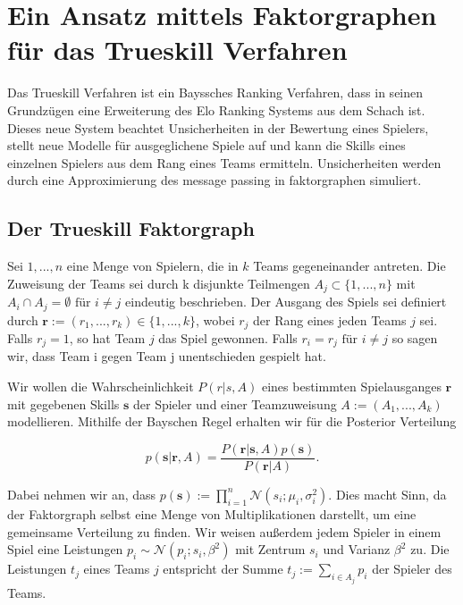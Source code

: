 \documentclass[12pt,a4paper]{scrartcl}
\numberwithin{equation}{section}
\begin{document}
 \newpage  %

\section{Ein Ansatz mittels Faktorgraphen für das Trueskill Verfahren}
Das Trueskill Verfahren ist ein Bayssches Ranking Verfahren, dass in seinen Grundzügen eine Erweiterung des
Elo Ranking Systems aus dem Schach ist. 
Dieses neue System beachtet Unsicherheiten in der Bewertung eines Spielers, stellt neue Modelle für ausgeglichene
Spiele auf und kann die Skills eines einzelnen Spielers aus dem Rang eines Teams ermitteln. 
Unsicherheiten werden durch eine Approximierung des message passing in faktorgraphen simuliert.  

\subsection{Der Trueskill Faktorgraph}

 Sei ${1,...,n}$ eine Menge von Spielern, die in $k$ Teams gegeneinander antreten. Die Zuweisung der Teams sei durch k disjunkte Teilmengen
 $A_j \subset \{1,...,n\}$ mit $A_i \cap A_j = \emptyset \text{ für } i \neq j$ eindeutig beschrieben. Der Ausgang des Spiels sei definiert durch $\mathbf{r} := (r_1,...,r_k) \in \{1,...,k\}$,
 wobei $r_j$ der Rang eines jeden Teams $j$ sei. Falls $r_j = 1$, so hat Team $j$ das Spiel gewonnen. Falls $r_i = r_j \text{ für } i \neq j$ so sagen wir, dass Team i gegen Team j
 unentschieden gespielt hat. 
 
 Wir wollen die Wahrscheinlichkeit $P(r|s,A)$ eines bestimmten Spielausganges $\mathbf{r}$ mit gegebenen Skills $\mathbf{s}$ der Spieler und einer Teamzuweisung $A := (A_1,...,A_k)$ modellieren. 
 Mithilfe der Bayschen Regel erhalten wir für die Posterior Verteilung
 
 \begin{equation}
  p(\mathbf{s}|\mathbf{r},A) = \frac{P(\mathbf{r}|\mathbf{s},A)p(\mathbf{s})}{P(\mathbf{r}|A)}.
 \end{equation}

 Dabei nehmen wir an, dass $p(\mathbf{s}) := \prod_{i = 1}^n \mathcal{N}(s_i;\mu_i,\sigma_i^2)$. Dies macht Sinn, da der Faktorgraph selbst eine Menge von Multiplikationen darstellt, um
 eine gemeinsame Verteilung zu finden. 
 Wir weisen außerdem jedem Spieler in einem Spiel eine Leistungen $p_i \sim \mathcal{N}(p_i; s_i,\beta^2)$ mit Zentrum $s_i$ und Varianz $\beta^2$ zu. Die Leistungen $t_j$ eines Teams
 $j$ entspricht der Summe $t_j := \sum_{i \in A_j} p_i$ der Spieler des Teams. 
 
\end{document}
